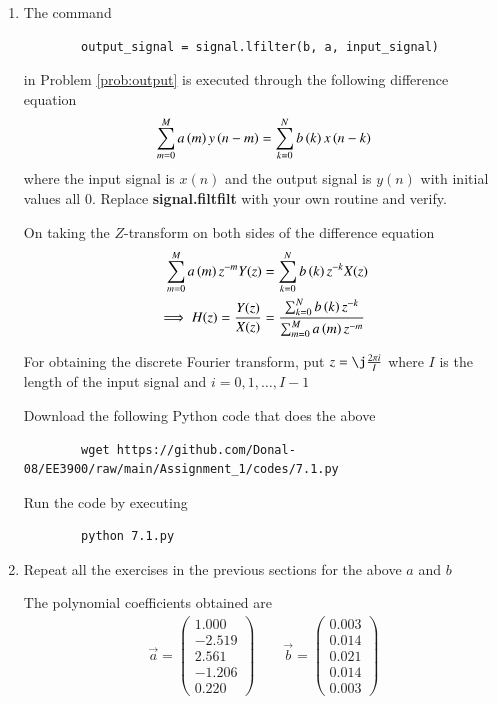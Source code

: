 \documentclass[journal,12pt,twocolumn]{IEEEtran}
\newcommand{\myvec}[1]{\ensuremath{\begin{pmatrix}#1\end{pmatrix}}}
\renewcommand\thesection{\arabic{section}}
\begin{document}
	\begin{enumerate}[label=\thesection.\arabic*]
	\item The command
	\begin{lstlisting}
		output_signal = signal.lfilter(b, a, input_signal)
	\end{lstlisting}
	in Problem \ref{prob:output} is executed through the following difference equation
	\begin{equation}
		\label{eq:iir_filter_gen}
 		\sum _{m=0}^{M}a\left(m\right)y\left(n-m\right)=\sum _{k=0}^{N}b\left(k\right)x\left(n-k\right)
	\end{equation}
	where the input signal is $x(n)$ and the output signal is $y(n)$ with initial values all 0. Replace \textbf{signal.filtfilt} with your own routine and verify.
	
	\solution On taking the $Z$-transform on both sides of the difference equation
	\begin{align}
		\sum _{m=0}^{M}a\left(m\right) z^{-m} Y(z) &= \sum _{k=0}^{N}b\left(k\right) z^{-k} X(z) \\
		\implies H(z) = \frac{Y(z)}{X(z)} &= \frac{\sum _{k=0}^{N}b\left(k\right) z^{-k}}{\sum _{m=0}^{M}a\left(m\right) z^{-m}}
	\end{align}
	
	For obtaining the discrete Fourier transform, put $z = \j \frac{2\pi i}{I}$ where $I$ is the length of the input signal and $i = 0, 1, \ldots, I-1$
	
	Download the following Python code that does the above
	\begin{lstlisting}
		wget https://github.com/Donal-08/EE3900/raw/main/Assignment_1/codes/7.1.py
	\end{lstlisting}
	
	Run the code by executing
	\begin{lstlisting}
		python 7.1.py
	\end{lstlisting}
	
	\item Repeat all the exercises in the previous sections for the above $a$ and $b$
	
	\solution The polynomial coefficients obtained are
	\begin{align}
		\vec{a} = \myvec{1.000 \\ -2.519 \\ 2.561 \\ -1.206 \\ 0.220} \qquad
		\vec{b} = \myvec{0.003 \\ 0.014 \\ 0.021 \\ 0.014 \\ 0.003}
	\end{align}
	

\end{enumerate}
\end{document}
